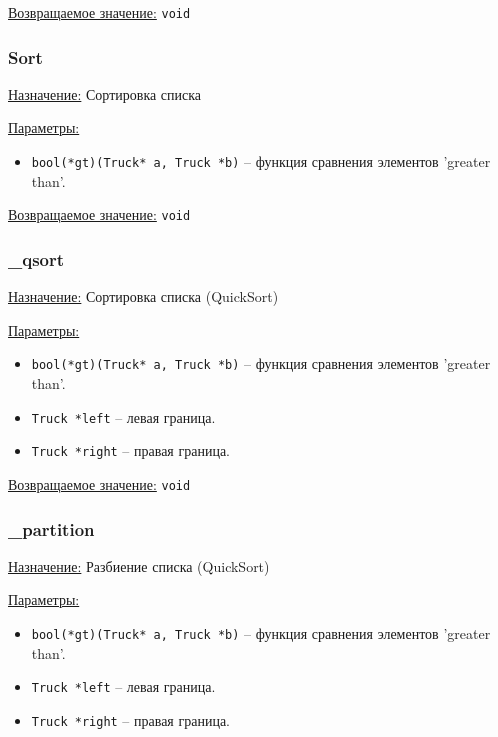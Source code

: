 \underline{Возвращаемое значение:} \verb|void|


\subsubsection*{Sort}

\underline{Назначение:} Сортировка списка

\underline{Параметры:} 

\begin{itemize}
    \item \verb|bool(*gt)(Truck* a, Truck *b)| -- функция сравнения элементов 'greater than'.
\end{itemize}

\underline{Возвращаемое значение:} \verb|void|


\subsubsection*{\_qsort}

\underline{Назначение:} Сортировка списка (QuickSort)

\underline{Параметры:} 

\begin{itemize}
    \item \verb|bool(*gt)(Truck* a, Truck *b)| -- функция сравнения элементов 'greater than'.
    \item \verb|Truck *left| -- левая граница.
    \item \verb|Truck *right| -- правая граница.
\end{itemize}

\underline{Возвращаемое значение:} \verb|void|


\subsubsection*{\_partition}

\underline{Назначение:} Разбиение списка (QuickSort)

\underline{Параметры:} 

\begin{itemize}
    \item \verb|bool(*gt)(Truck* a, Truck *b)| -- функция сравнения элементов 'greater than'.
    \item \verb|Truck *left| -- левая граница.
    \item \verb|Truck *right| -- правая граница.
\end{itemize}

